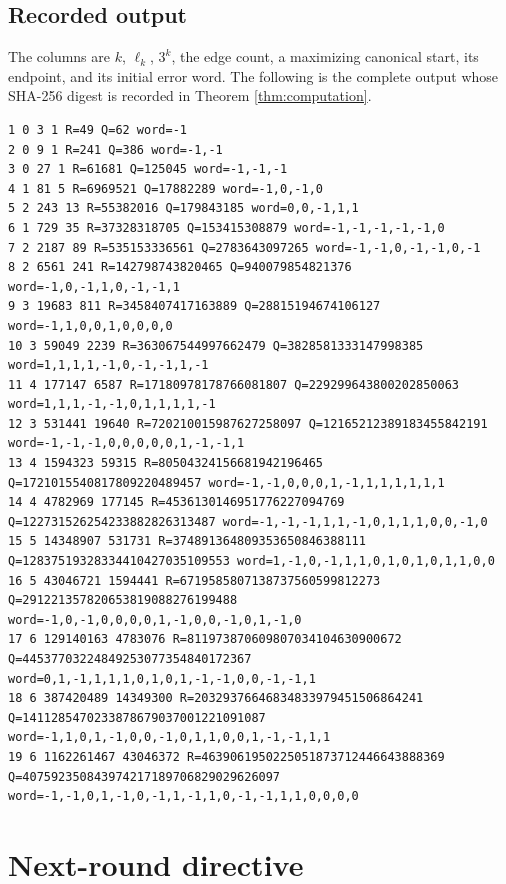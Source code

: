 \documentclass[11pt]{article}
\theoremstyle{definition}
\theoremstyle{remark}
\begin{document}
\subsection*{Recorded output}
The columns are $k$, $\ell_k$, $3^k$, the edge count, a maximizing canonical start, its endpoint, and its initial error word. The following is the complete output whose SHA-256 digest is recorded in Theorem \ref{thm:computation}.

\begin{list}{}{\setlength{\leftmargin}{-0.27in}\setlength{\rightmargin}{-0.27in}}
\item[]
\tiny
\begin{verbatim}
1 0 3 1 R=49 Q=62 word=-1
2 0 9 1 R=241 Q=386 word=-1,-1
3 0 27 1 R=61681 Q=125045 word=-1,-1,-1
4 1 81 5 R=6969521 Q=17882289 word=-1,0,-1,0
5 2 243 13 R=55382016 Q=179843185 word=0,0,-1,1,1
6 1 729 35 R=37328318705 Q=153415308879 word=-1,-1,-1,-1,-1,0
7 2 2187 89 R=535153336561 Q=2783643097265 word=-1,-1,0,-1,-1,0,-1
8 2 6561 241 R=142798743820465 Q=940079854821376 word=-1,0,-1,1,0,-1,-1,1
9 3 19683 811 R=3458407417163889 Q=28815194674106127 word=-1,1,0,0,1,0,0,0,0
10 3 59049 2239 R=363067544997662479 Q=3828581333147998385 word=1,1,1,1,-1,0,-1,-1,1,-1
11 4 177147 6587 R=17180978178766081807 Q=229299643800202850063 word=1,1,1,-1,-1,0,1,1,1,1,-1
12 3 531441 19640 R=720210015987627258097 Q=12165212389183455842191 word=-1,-1,-1,0,0,0,0,0,1,-1,-1,1
13 4 1594323 59315 R=80504324156681942196465 Q=1721015540817809220489457 word=-1,-1,0,0,0,1,-1,1,1,1,1,1,1
14 4 4782969 177145 R=4536130146951776227094769 Q=122731526254233882826313487 word=-1,-1,-1,1,1,-1,0,1,1,1,0,0,-1,0
15 5 14348907 531731 R=374891364809353650846388111 Q=12837519328334410427035109553 word=1,-1,0,-1,1,1,0,1,0,1,0,1,1,0,0
16 5 43046721 1594441 R=6719585807138737560599812273 Q=291221357820653819088276199488 word=-1,0,-1,0,0,0,0,1,-1,0,0,-1,0,1,-1,0
17 6 129140163 4783076 R=811973870609807034104630900672 Q=44537703224849253077354840172367 word=0,1,-1,1,1,1,0,1,0,1,-1,-1,0,0,-1,-1,1
18 6 387420489 14349300 R=20329376646834833979451506864241 Q=1411285470233878679037001221091087 word=-1,1,0,1,-1,0,0,-1,0,1,1,0,0,1,-1,-1,1,1
19 6 1162261467 43046372 R=4639061950225051873712446643888369 Q=407592350843974217189706829029626097 word=-1,-1,0,1,-1,0,-1,1,-1,1,0,-1,-1,1,1,0,0,0,0
\end{verbatim}
\normalsize
\end{list}

\section{Next-round directive}
\end{document}
